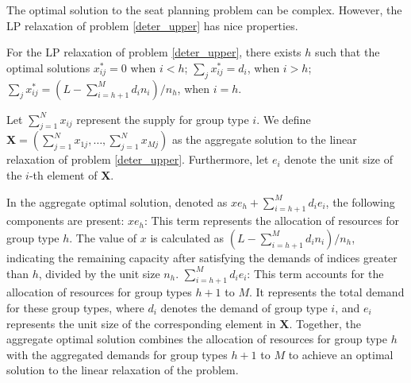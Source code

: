 

The optimal solution to the seat planning problem can be complex. However, the LP relaxation of problem \eqref{deter_upper} has nice properties.

\begin{lem}\label{sol_relax_deter}
For the LP relaxation of problem \eqref{deter_upper}, there exists $h$ such that the optimal solutions $x_{ij}^{*} = 0$ when $i < h$; $\sum_{j} x_{ij}^{*} = d_{i}$, when $i > h$; $\sum_{j} x_{ij}^{*} = (L - \sum_{i = h+1}^{M} {d_i n_i})/ n_h$, when $i = h$.
\end{lem}

Let $\sum_{j=1}^{N} x_{ij}$ represent the supply for group type $i$. We define $\mathbf{X} = (\sum_{j=1}^{N} x_{1j},\ldots, \sum_{j=1}^{N} x_{Mj})$ as the aggregate solution to the linear relaxation of problem \eqref{deter_upper}. Furthermore, let $e_{i}$ denote the unit size of the $i$-th element of $\mathbf{X}$.

In the aggregate optimal solution, denoted as $x e_{h} + \sum_{i=h+1} ^{M} d_{i} e_{i}$, the following components are present: $x e_{h}$: This term represents the allocation of resources for group type $h$. The value of $x$ is calculated as $(L- \sum_{i = h+1}^{M} {d_i n_i})/ n_h$, indicating the remaining capacity after satisfying the demands of indices greater than $h$, divided by the unit size $n_h$. $\sum_{i=h+1} ^{M} d_{i} e_{i}$: This term accounts for the allocation of resources for group types $h+1$ to $M$. It represents the total demand for these group types, where $d_i$ denotes the demand of group type $i$, and $e_{i}$ represents the unit size of the corresponding element in $\mathbf{X}$. Together, the aggregate optimal solution combines the allocation of resources for group type $h$ with the aggregated demands for group types $h+1$ to $M$ to achieve an optimal solution to the linear relaxation of the problem.



